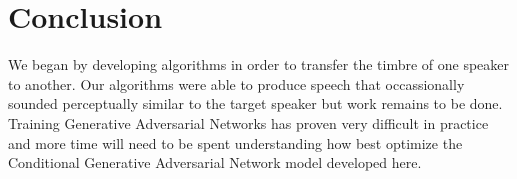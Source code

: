 \documentclass{article}
\begin{document}
\newpage
\section{Conclusion}
We began by developing algorithms in order to transfer the timbre of one speaker to another. Our algorithms were able to produce speech that occassionally sounded perceptually similar to the target speaker but work remains to be done. Training Generative Adversarial Networks has proven very difficult in practice and more time will need to be spent understanding how best optimize the Conditional Generative Adversarial Network model developed here.

{\small
\clearpage

}
\end{document}

